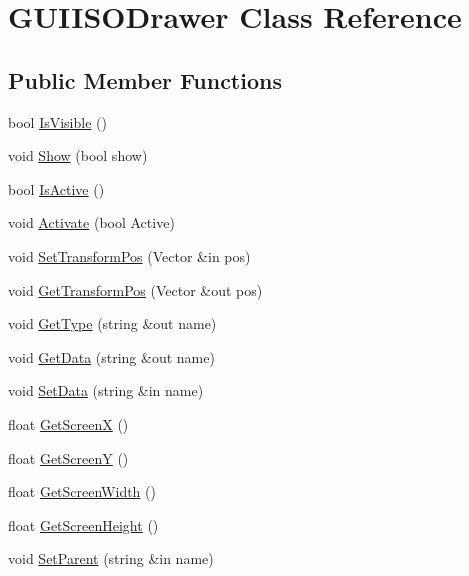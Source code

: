 \hypertarget{class_g_u_i_i_s_o_drawer}{}\section{G\+U\+I\+I\+S\+O\+Drawer Class Reference}
\label{class_g_u_i_i_s_o_drawer}
\subsection*{Public Member Functions}
\begin{DoxyCompactItemize}
\item 
bool \hyperlink{class_g_u_i_i_s_o_drawer_ab9945ad04dcba7babf8c0ea022dcf8fc}{Is\+Visible} ()
\item 
void \hyperlink{class_g_u_i_i_s_o_drawer_ac61217f81e03aab3e255a7b72a86d8f1}{Show} (bool show)
\item 
bool \hyperlink{class_g_u_i_i_s_o_drawer_aca4e2ee8ae44ed6e762510c06d994c86}{Is\+Active} ()
\item 
void \hyperlink{class_g_u_i_i_s_o_drawer_af097d861d09c8567045381e3b00eec8d}{Activate} (bool Active)
\item 
void \hyperlink{class_g_u_i_i_s_o_drawer_a9fa78617a5ada045b826f6cc56047b04}{Set\+Transform\+Pos} (Vector \&in pos)
\item 
void \hyperlink{class_g_u_i_i_s_o_drawer_af8dde03018f10d559bdc283d818346b3}{Get\+Transform\+Pos} (Vector \&out pos)
\item 
void \hyperlink{class_g_u_i_i_s_o_drawer_a886ee169a052fb15d9aedf517e587aff}{Get\+Type} (string \&out name)
\item 
void \hyperlink{class_g_u_i_i_s_o_drawer_ac1c1efb0e8f95eef67b16f933693a319}{Get\+Data} (string \&out name)
\item 
void \hyperlink{class_g_u_i_i_s_o_drawer_a58b6d885f773441479bdee31b1ed3238}{Set\+Data} (string \&in name)
\item 
float \hyperlink{class_g_u_i_i_s_o_drawer_adbb34490e2cb0f71270ebb9711154a58}{Get\+ScreenX} ()
\item 
float \hyperlink{class_g_u_i_i_s_o_drawer_aeb8767154af2e5309c50aacca5b5b355}{Get\+ScreenY} ()
\item 
float \hyperlink{class_g_u_i_i_s_o_drawer_a410165e47a97a400fd59acbae335a635}{Get\+Screen\+Width} ()
\item 
float \hyperlink{class_g_u_i_i_s_o_drawer_adcdb5a708bfdf9b195ed675bb5b6ad51}{Get\+Screen\+Height} ()
\item 
void \hyperlink{class_g_u_i_i_s_o_drawer_ace49c53f2f9e3d4f38cb9ef96e012992}{Set\+Parent} (string \&in name)

\end{DoxyCompactItemize}
